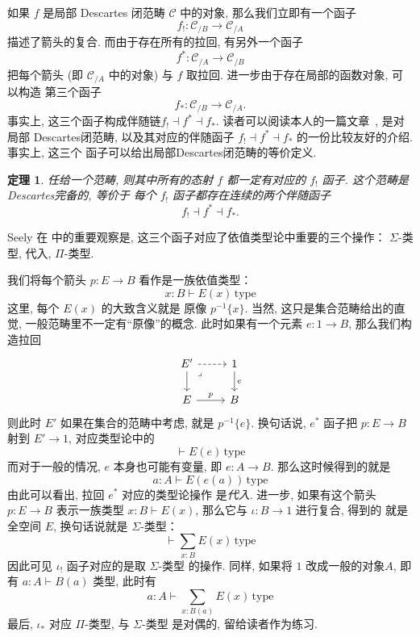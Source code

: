 \documentclass[UTF8]{ctexbook}
\theoremstyle{plain}
\newtheorem{theorem}{定理}[chapter]
\theoremstyle{definition}
\theoremstyle{remark}
\begin{document}
如果 \(f\) 是局部 Descartes 闭范畴 \(\mathcal C\)
中的对象, 那么我们立即有一个函子
\[f_! : \mathcal C_{/B} \to \mathcal C_{/A}\]
描述了箭头的复合. 而由于存在所有的拉回, 有另外一个函子
\[f^* : \mathcal C_{/A} \to \mathcal C_{/B}\]
把每个箭头 (即 \(\mathcal C_{/A}\) 中的对象) 与
\(f\) 取拉回. 进一步由于存在局部的函数对象, 可以构造
第三个函子
\[f_* : \mathcal C_{/B} \to \mathcal C_{/A}.\]
事实上, 这三个函子构成伴随链\(f_!\dashv f^*\dashv f_*\).
读者可以阅读本人的一篇文章~\cite{me:2022:lccc}, 是对局部
Descartes闭范畴, 以及其对应的伴随函子 \(f_!\dashv
f^*\dashv f_*\) 的一份比较友好的介绍. 事实上, 这三个
函子可以给出局部Descartes闭范畴的等价定义.
\begin{theorem}
任给一个范畴, 则其中所有的态射 \(f\) 都一定有对应的
\(f_!\) 函子. 这个范畴是Descartes完备的, 等价于
每个 \(f_!\) 函子都存在连续的两个伴随函子
\[f_!\dashv f^*\dashv f_*.\]
\end{theorem}

Seely 在 \cite{seely:1984:lccc} 中的重要观察是,
这三个函子对应了依值类型论中重要的三个操作：
\(\Sigma\)-类型, 代入, \(\Pi\)-类型.

我们将每个箭头 \(p : E \to B\) 看作是一族依值类型：
\[x:B \vdash E(x)\,\mathrm{type}\]
这里, 每个 \(E(x)\) 的大致含义就是
原像 \(p^{-1}\{x\}\). 当然, 这只是集合范畴给出的直觉,
一般范畴里不一定有“原像”的概念. 此时如果有一个元素
\(e : 1 \to B\), 那么我们构造拉回
\[\begin{tikzcd}
  {E'} & 1 \\
  E & B
  \arrow[dashed, from=1-1, to=1-2]
  \arrow[from=1-1, to=2-1]
  \arrow["p", from=2-1, to=2-2]
  \arrow["e", from=1-2, to=2-2]
  \arrow["\lrcorner"{anchor=center, pos=0.125}, draw=none, from=1-1, to=2-2]
\end{tikzcd}\]
则此时 \(E'\) 如果在集合的范畴中考虑, 就是
\(p^{-1}\{e\}\). 换句话说, \(e^{*}\) 函子把
\(p : E \to B\) 射到 \(E' \to 1\), 对应类型论中的
\[\vdash E(e) \, \text{type}\]
而对于一般的情况, \(e\) 本身也可能有变量, 即
\(e : A \to B\). 那么这时候得到的就是
\[a : A \vdash E(e(a)) \, \text{type}\]
由此可以看出, 拉回 \(e^*\) 对应的类型论操作
是\emph{代入}. 进一步, 如果有这个箭头 \(p : E \to B\)
表示一族类型 \(x:B \vdash E(x)\),
那么它与 \(\iota : B \to 1\) 进行复合, 得到的
就是全空间 \(E\), 换句话说就是 \(\Sigma\)-类型：
\[\vdash \sum_{x:B}E(x) \, \text{type}\]
因此可见 \(\iota_!\) 函子对应的是取 \(\Sigma\)-类型
的操作. 同样, 如果将 \(1\) 改成一般的对象\(A\), 即有
\(a : A \vdash B(a)\) 类型, 此时有
\[a : A \vdash \sum_{x : B(a)} E(x)\, \text{type}\]
最后, \(\iota_*\) 对应 \(\Pi\)-类型, 与 \(\Sigma\)-类型
是对偶的, 留给读者作为练习.
\end{document}

